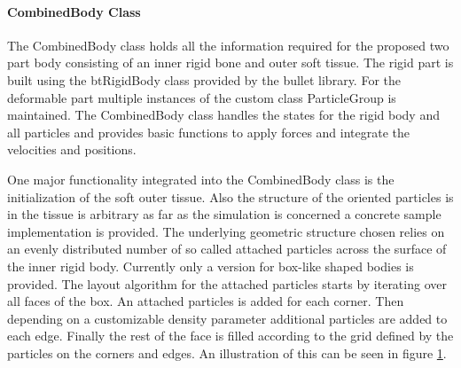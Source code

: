 \paragraph{CombinedBody Class}
The CombinedBody class holds all the information required for the proposed two part body consisting of an inner rigid bone and outer soft tissue. The rigid part is built using the btRigidBody class provided by the bullet library. For the deformable part multiple instances of the custom class ParticleGroup is maintained. The CombinedBody class handles the states for the rigid body and all particles and provides basic functions to apply forces and integrate the velocities and positions.

One major functionality integrated into the CombinedBody class is the initialization of the soft outer tissue. Also the structure of the oriented particles is in the tissue is arbitrary as far as the simulation is concerned a concrete sample implementation is provided. The underlying geometric structure chosen relies on an evenly distributed number of so called attached particles across the surface of the inner rigid body. Currently only a version for box-like shaped bodies is provided. The layout algorithm for the attached particles starts by iterating over all faces of the box. An attached particles is added for each corner. Then depending on a customizable density parameter additional particles are added to each edge. Finally the rest of the face is filled according to the grid defined by the particles on the corners and edges. An illustration of this can be seen in figure \ref{fig:combined_body_density}.

\begin{figure}[htb]
  \centering
\hspace{2cm}
  \label{fig:combined_body_density}
\end{figure}

